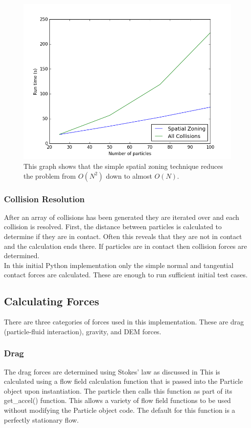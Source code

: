 \documentclass[10pt,a4paper,titlepage]{report}
\begin{document}
\begin{figure}[!ht]
\centering
\includegraphics[scale=0.75]{figures/RunTimeAgainstNumberOfParticlesPython.png}
\caption{This graph shows that the simple spatial zoning technique reduces the problem from $O(N^{2})$ down to almost $O(N)$.}
\label{fig:run_time_against_N_python}
\end{figure}
\subsubsection{Collision Resolution}
After an array of collisions has been generated they are iterated over and each collision is resolved. First, the distance between particles is calculated to determine if they are in contact. Often this reveals that they are not in contact and the calculation ends there. If particles are in contact then collision forces are determined.
\\In this initial Python implementation only the simple normal and tangential contact forces are calculated. These are enough to run sufficient initial test cases.
\subsection{Calculating Forces}
There are three categories of forces used in this implementation. These are drag (particle-fluid interaction), gravity, and DEM forces.
\subsubsection{Drag}
The drag forces are determined using Stokes' law as discussed in %
This is calculated using a flow field calculation function that is passed into the Particle object upon instantiation. The particle then calls this function as part of its get\_accel() function. This allows a variety of flow field functions to be used without modifying the Particle object code. The default for this function is a perfectly stationary flow.
\end{document}
